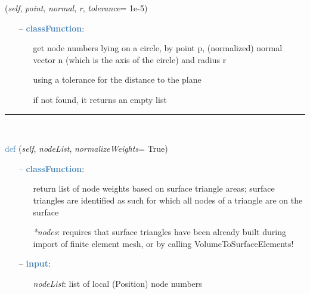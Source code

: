 \begin{itemize}[leftmargin=1.4cm]
\begin{itemize}[leftmargin=1.4cm]
\begin{itemize}[leftmargin=1.4cm]
\begin{itemize}[leftmargin=0.5cm]
\begin{itemize}[leftmargin=1.4cm]
\begin{itemize}[leftmargin=1.4cm]
\begin{itemize}[leftmargin=0.5cm]
\begin{flushleft}
({\it self}, {\it point}, {\it normal}, {\it r}, {\it tolerance}= 1e-5)
\end{flushleft}
\setlength{\itemindent}{0.7cm}
\begin{itemize}[leftmargin=0.7cm]
\item[--]\textcolor{steelblue}{\bf classFunction}: \vspace{-6pt}
\begin{itemize}[leftmargin=1.2cm]
\setlength{\itemindent}{-0.7cm}
\item[]get node numbers lying on a circle, by point p, (normalized) normal vector n (which is the axis of the circle) and radius r
\item[]using a tolerance for the distance to the plane
\item[]if not found, it returns an empty list
\end{itemize}
\vspace{12pt}\end{itemize}
%
\noindent\rule{8cm}{0.75pt}\vspace{1pt} \\ 
\begin{flushleft}
\noindent \textcolor{steelblue}{def {\bf {}}}\label{sec:FEM:FEMinterface:GetNodeWeightsFromSurfaceAreas}
({\it self}, {\it nodeList}, {\it normalizeWeights}= True)
\end{flushleft}
\setlength{\itemindent}{0.7cm}
\begin{itemize}[leftmargin=0.7cm]
\item[--]\textcolor{steelblue}{\bf classFunction}: \vspace{-6pt}
\begin{itemize}[leftmargin=1.2cm]
\setlength{\itemindent}{-0.7cm}
\item[]return list of node weights based on surface triangle areas; surface triangles are identified as such for which all nodes of a triangle are on the surface
\item[]{\it **nodes}: requires that surface triangles have been already built during import of finite element mesh, or by calling VolumeToSurfaceElements!
\end{itemize}
\item[--]\textcolor{steelblue}{\bf input}: \vspace{-6pt}
\begin{itemize}[leftmargin=1.2cm]
\setlength{\itemindent}{-0.7cm}
\item[]{\it nodeList}: list of local (Position) node numbers

\end{itemize}
\end{itemize}
\end{itemize}
\end{itemize}
\end{itemize}
\end{itemize}
\end{itemize}
\end{itemize}
\end{itemize}
